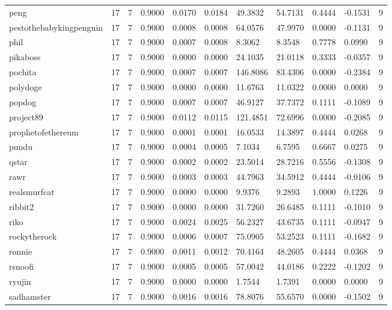 \begin{table}[htbp]
\begin{tabular}{lllllllllll}
peng & 17 & 7 & 0.9000 & 0.0170 & 0.0184 & 49.3832 & 54.7131 & 0.4444 & -0.1531 & 9 \\
pestothebabykingpenguin & 17 & 7 & 0.9000 & 0.0008 & 0.0008 & 64.0576 & 47.9970 & 0.0000 & -0.1131 & 9 \\
phil & 17 & 7 & 0.9000 & 0.0007 & 0.0008 & 8.3062 & 8.3548 & 0.7778 & 0.0990 & 9 \\
pikaboss & 17 & 7 & 0.9000 & 0.0000 & 0.0000 & 24.1035 & 21.0118 & 0.3333 & -0.0357 & 9 \\
pochita & 17 & 7 & 0.9000 & 0.0007 & 0.0007 & 146.8086 & 83.4306 & 0.0000 & -0.2384 & 9 \\
polydoge & 17 & 7 & 0.9000 & 0.0000 & 0.0000 & 11.6763 & 11.0322 & 0.0000 & 0.0000 & 9 \\
popdog & 17 & 7 & 0.9000 & 0.0007 & 0.0007 & 46.9127 & 37.7372 & 0.1111 & -0.1089 & 9 \\
project89 & 17 & 7 & 0.9000 & 0.0112 & 0.0115 & 121.4851 & 72.6996 & 0.0000 & -0.2085 & 9 \\
prophetofethereum & 17 & 7 & 0.9000 & 0.0001 & 0.0001 & 16.0533 & 14.3897 & 0.4444 & 0.0268 & 9 \\
pundu & 17 & 7 & 0.9000 & 0.0004 & 0.0005 & 7.1034 & 6.7595 & 0.6667 & 0.0275 & 9 \\
qstar & 17 & 7 & 0.9000 & 0.0002 & 0.0002 & 23.5014 & 28.7216 & 0.5556 & -0.1308 & 9 \\
rawr & 17 & 7 & 0.9000 & 0.0003 & 0.0003 & 44.7963 & 34.5912 & 0.4444 & -0.0106 & 9 \\
realsmurfcat & 17 & 7 & 0.9000 & 0.0000 & 0.0000 & 9.9376 & 9.2893 & 1.0000 & 0.1226 & 9 \\
ribbit2 & 17 & 7 & 0.9000 & 0.0000 & 0.0000 & 31.7260 & 26.6485 & 0.1111 & -0.1010 & 9 \\
riko & 17 & 7 & 0.9000 & 0.0024 & 0.0025 & 56.2327 & 43.6735 & 0.1111 & -0.0947 & 9 \\
rockytherock & 17 & 7 & 0.9000 & 0.0006 & 0.0007 & 75.0905 & 53.2523 & 0.1111 & -0.1682 & 9 \\
ronnie & 17 & 7 & 0.9000 & 0.0011 & 0.0012 & 70.4164 & 48.2605 & 0.4444 & 0.0368 & 9 \\
rsnoofi & 17 & 7 & 0.9000 & 0.0005 & 0.0005 & 57.0042 & 44.0186 & 0.2222 & -0.1202 & 9 \\
ryujin & 17 & 7 & 0.9000 & 0.0000 & 0.0000 & 1.7544 & 1.7391 & 0.0000 & 0.0000 & 9 \\
sadhamster & 17 & 7 & 0.9000 & 0.0016 & 0.0016 & 78.8076 & 55.6570 & 0.0000 & -0.1502 & 9 \\

\end{tabular}
\end{table}
